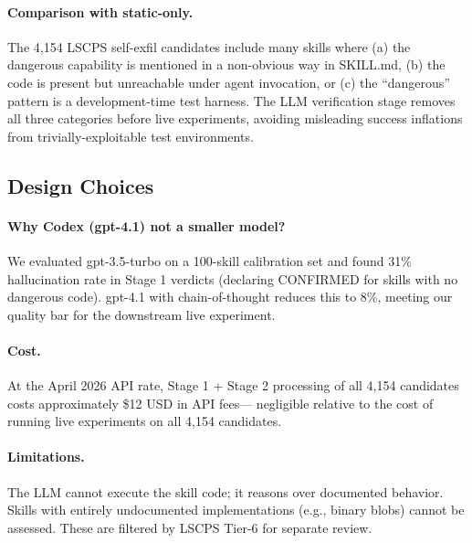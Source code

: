 \paragraph{Comparison with static-only.}
The 4,154 LSCPS self-exfil candidates include many skills where
(a) the dangerous capability is mentioned in a non-obvious way in SKILL.md,
(b) the code is present but unreachable under agent invocation,
or (c) the ``dangerous'' pattern is a development-time test harness.
The LLM verification stage removes all three categories before live experiments,
avoiding misleading success inflations from trivially-exploitable test environments.

\subsection{Design Choices}

\paragraph{Why Codex (gpt-4.1) not a smaller model?}
We evaluated gpt-3.5-turbo on a 100-skill calibration set
and found 31\% hallucination rate in Stage 1 verdicts
(declaring CONFIRMED for skills with no dangerous code).
gpt-4.1 with chain-of-thought reduces this to 8\%, meeting our
quality bar for the downstream live experiment.

\paragraph{Cost.}
At the April 2026 API rate, Stage 1 + Stage 2 processing of all
4,154 candidates costs approximately \$12 USD in API fees---
negligible relative to the cost of running live experiments
on all 4,154 candidates.

\paragraph{Limitations.}
The LLM cannot execute the skill code; it reasons over documented behavior.
Skills with entirely undocumented implementations (e.g., binary blobs)
cannot be assessed. These are filtered by LSCPS Tier-6 for separate review.
